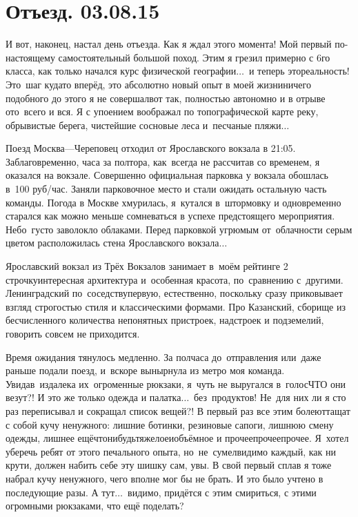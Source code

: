 \chapter{Отъезд. 03.08.15}

И вот, наконец, настал день отъезда. Как я ждал этого момента! Мой первый по-настоящему самостоятельный большой поход. Этим я грезил примерно с 6\sdash го класса, как только начался курс физической географии$\ldots$~и теперь это\mdash реальность! Это~шаг куда\sdash то вперёд, это абсолютно новый опыт в моей жизни\mdash ничего подобного до этого я не совершал\mdash вот так, полностью автономно и в отрыве ото~всего и вся. Я с упоением воображал по топографической карте реку, обрывистые берега, чистейшие сосновые леса и~песчаные пляжи$\ldots$ 

Поезд Москва\thinspace---\thinspace Череповец отходил от Ярославского вокзала в 21:05. Заблаговременно, часа за полтора, как~всегда не рассчитав со временем, я оказался на вокзале. Совершенно официальная парковка у вокзала обошлась в~100 руб/час. Заняли парковочное место и стали ожидать остальную часть команды. Погода в Москве хмурилась, я~кутался в~штормовку и одновременно старался как можно меньше сомневаться в успехе предстоящего мероприятия. Небо~густо заволокло облаками. Перед парковкой угрюмым от~облачности серым цветом расположилась стена Ярославского вокзала$\ldots$

Ярославский вокзал из Трёх Вокзалов занимает в~моём рейтинге 2 строчку\mdash интересная архитектура и~особенная красота, по~сравнению с~другими. Ленинградский по~соседству\mdash первую, естественно, поскольку сразу приковывает взгляд строгостью стиля и классическими формами. Про Казанский, сборище из бесчисленного количества непонятных пристроек, надстроек и подземелий, говорить совсем не приходится.

Время ожидания тянулось медленно. За полчаса до~отправления или~даже раньше подали поезд, и~вскоре вынырнула из метро моя команда. Увидав~издалека их~огроменные рюкзаки, я~чуть не выругался в~голос\mdash ЧТО они везут?! И это же только одежда и палатка$\ldots$~без~продуктов! Не~для них ли я сто раз переписывал и сокращал список вещей?! В первый раз все этим болеют\mdash тащат с собой кучу ненужного: лишние ботинки, резиновые сапоги, лишнюю смену одежды, лишнее ещё\sdash что\sdash нибудь\sdash тяжелое\sdash и\sdash объёмное и прочее\sdash прочее\sdash прочее. Я~хотел уберечь ребят от этого печального опыта, но~не~сумел\mdash видимо каждый, как ни крути, должен набить себе эту шишку сам, увы. В свой первый сплав я тоже набрал кучу ненужного, чего вполне мог бы не брать. И это было учтено в последующие разы. А тут$\ldots$~видимо, придётся с этим смириться, с этими огромными рюкзаками, что ещё поделать?

